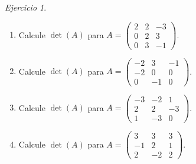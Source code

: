 \documentclass[12pt]{article}
\theoremstyle{remark}
\newtheorem{Ejer}[definicion]{Ejercicio}
\begin{document}
\begin{Ejer}
\begin{enumerate}[start=151]
\item Calcule $\det(A)$ para $A=\begin{pmatrix}2&2&-3\\0&2&3\\0&3&-1\end{pmatrix}$.

\item Calcule $\det(A)$ para $A=\begin{pmatrix}-2&3&-1\\-2&0&0\\0&-1&0\end{pmatrix}$.

\item Calcule $\det(A)$ para $A=\begin{pmatrix}-3&-2&1\\2&2&-3\\1&-3&0\end{pmatrix}$.

\item Calcule $\det(A)$ para $A=\begin{pmatrix}3&3&3\\-1&2&1\\2&-2&2\end{pmatrix}$.

\end{enumerate}
\end{Ejer}
\end{document}
